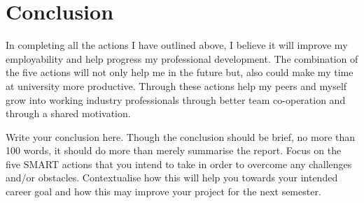 \documentclass{scrartcl}
\begin{document}
\section{Conclusion}
In completing all the actions I have outlined above, I believe it will improve my employability and help progress my professional development. The combination of the five actions will not only help me in the future but, also could make my time at university more productive. Through these actions help my peers and myself grow into working industry professionals through better team co-operation and through a shared motivation.

Write your conclusion here. Though the conclusion should be brief, no more than 100 words, it should do more than merely summarise the report. Focus on the five SMART actions that you intend to take in order to overcome any challenges and/or obstacles. Contextualise how this will help you towards your intended career goal and how this may improve your project for the next semester.



\end{document}
